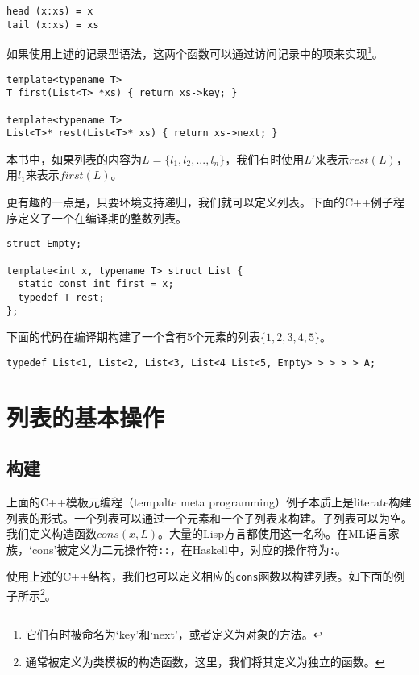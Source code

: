 \documentclass[UTF8]{article}
\begin{document}
\lstset{language=Haskell}
\begin{lstlisting}
head (x:xs) = x
tail (x:xs) = xs
\end{lstlisting}

如果使用上述的记录型语法，这两个函数可以通过访问记录中的项来实现\footnote{它们有时被命名为‘key’和‘next’，或者定义为对象的方法。}。

\lstset{language=C++}
\begin{lstlisting}
template<typename T>
T first(List<T> *xs) { return xs->key; }

template<typename T>
List<T>* rest(List<T>* xs) { return xs->next; }
\end{lstlisting}

本书中，如果列表的内容为$L = \{ l_1, l_2, ..., l_n\}$，我们有时使用$L'$来表示$rest(L)$，用$l_1$来表示$first(L)$。

更有趣的一点是，只要环境支持递归，我们就可以定义列表。下面的C++例子程序定义了一个在编译期的整数列表。

\lstset{language=C++}
\begin{lstlisting}
struct Empty;

template<int x, typename T> struct List {
  static const int first = x;
  typedef T rest;
};
\end{lstlisting}

下面的代码在编译期构建了一个含有5个元素的列表$\{1, 2, 3, 4, 5\}$。

\begin{lstlisting}
typedef List<1, List<2, List<3, List<4 List<5, Empty> > > > > A;
\end{lstlisting}

\section{列表的基本操作}

\subsection{构建}

上面的C++模板元编程（tempalte meta programming）例子本质上是literate构建列表的形式。一个列表可以通过一个元素和一个子列表来构建。子列表可以为空。我们定义构造函数$cons(x, L)$。大量的Lisp方言都使用这一名称。在ML语言家族，‘cons’被定义为二元操作符\texttt{::}，在Haskell中，对应的操作符为\texttt{:}。

使用上述的C++结构，我们也可以定义相应的\texttt{cons}函数以构建列表。如下面的例子所示\footnote{通常被定义为类模板的构造函数，这里，我们将其定义为独立的函数。}。
\end{document}

